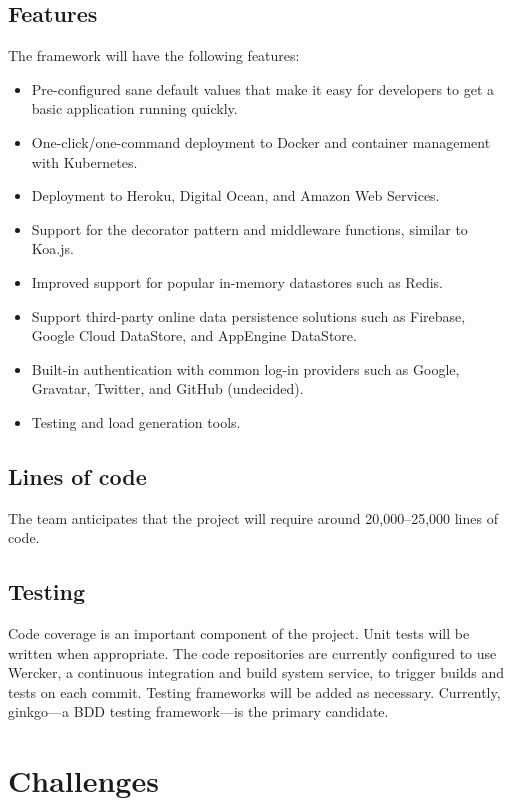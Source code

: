 \documentclass{article}
\begin{document}
\subsection{Features}

The framework will have the following features:

\begin{itemize}
	\item Pre-configured sane default values that make it easy for developers to get a basic application running quickly.
	\item One-click/one-command deployment to Docker and container management with Kubernetes.
    \item Deployment to Heroku, Digital Ocean, and Amazon Web Services.
    \item Support for the decorator pattern and middleware functions, similar to Koa.js.
    \item Improved support for popular in-memory datastores such as Redis.
	\item Support third-party online data persistence solutions such as Firebase, Google Cloud DataStore, and AppEngine DataStore.
    \item Built-in authentication with common log-in providers such as Google, Gravatar, Twitter, and GitHub (undecided).
    \item Testing and load generation tools.
\end{itemize}

\subsection{Lines of code}

The team anticipates that the project will require around 20,000--25,000 lines of code.

\subsection{Testing}

Code coverage is an important component of the project. Unit tests will be written when appropriate. The code repositories are currently configured to use Wercker, a continuous integration and build system service, to trigger builds and tests on each commit. Testing frameworks will be added as necessary. Currently, ginkgo---a BDD testing framework---is the primary candidate.

\section{Challenges}
\end{document}
